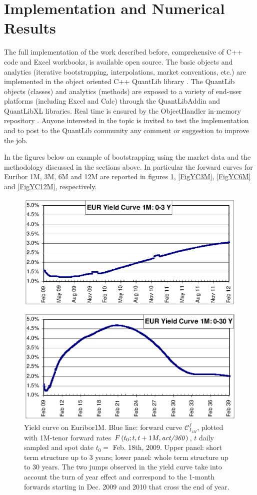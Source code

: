 \documentclass[11pt,reqno]{amsart}
\begin{document}
\section{Implementation and Numerical Results}
\label{sec:ImplementResults}
The full implementation of the work described before, comprehensive of C++ code and Excel workbooks, is available open source. The basic objects and analytics (iterative bootstrapping, interpolations, market conventions, etc.) are implemented in the object oriented C++ QuantLib library \cite{QuantLib}. The QuantLib objects (classes) and analytics (methods) are exposed to a variety of end-user platforms (including Excel and Calc) through the QuantLibAddin \cite{QuantLibAddin} and QuantLibXL \cite{QuantLibXL} libraries. Real time is ensured by the ObjectHandler in-memory repository \cite{ObjectHandler}.
Anyone interested in the topic is invited to test the implementation and to post to the QuantLib community any comment or suggestion to improve the job.
\par
In the figures below an example of bootstrapping using the market data and the methodology discussed in the sections above. In particular the forward curves for Euribor 1M, 3M, 6M and 12M are reported in figures \ref{FigYC1M}, \ref{FigYC3M}, \ref{FigYC6M} and \ref{FigYC12M}, respectively.

\begin{figure}[p]
\centering
\includegraphics[scale=1.0]{../figures/FigYC1M}
\caption{Yield curve on Euribor1M. Blue line: forward curve $\mathcal{C}_{I_{1M}}^f$, plotted with 1M-tenor forward rates $F\left( t_{0};t,t+1M,\text{\textit{act/360}}\right)$, $t$ daily sampled and spot date $t_{0}=$ Feb. 18th, 2009. Upper panel: short term structure up to 3 years; lower panel: whole term structure up to 30 years. The two jumps observed in the yield curve take into account the turn of year effect and correspond to the 1-month forwards starting in Dec. 2009 and 2010 that cross the end of year.}
\label{FigYC1M}
\end{figure}
\end{document}
